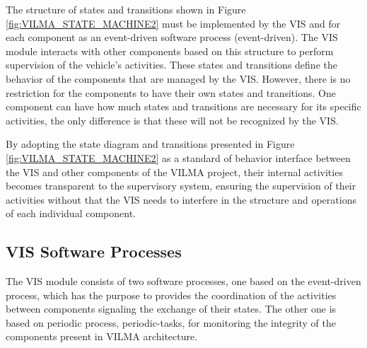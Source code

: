 \documentclass[conference]{IEEEtran}
\begin{document}
The structure of states and transitions shown in Figure \ref{fig:VILMA_STATE_MACHINE2} must be implemented by the VIS and for each component as an event-driven software process (event-driven). The VIS module interacts with other components based on this structure to perform supervision of the vehicle's activities. These states and transitions define the behavior of the components that are managed by the VIS. However, there is no restriction for the components to have their own states and transitions. One component can have how much states and transitions are necessary for its specific activities, the only difference is that these will not be recognized by the VIS.


By adopting the state diagram and transitions presented in Figure \ref{fig:VILMA_STATE_MACHINE2} as a standard of behavior interface between the VIS and other components of the VILMA project, their internal activities becomes transparent to the supervisory system, ensuring the supervision of their activities without that the VIS needs to interfere in the structure and operations of each individual component.

%
%
\subsection{VIS Software Processes}\label{subsec:vis_software_processes}

The VIS module consists of two software processes, one based on the event-driven process, which has the purpose to provides the coordination of the activities between components signaling the exchange of their states. The other one is based on periodic process, periodic-tasks, for monitoring the integrity of the components present in VILMA architecture.
\end{document}
